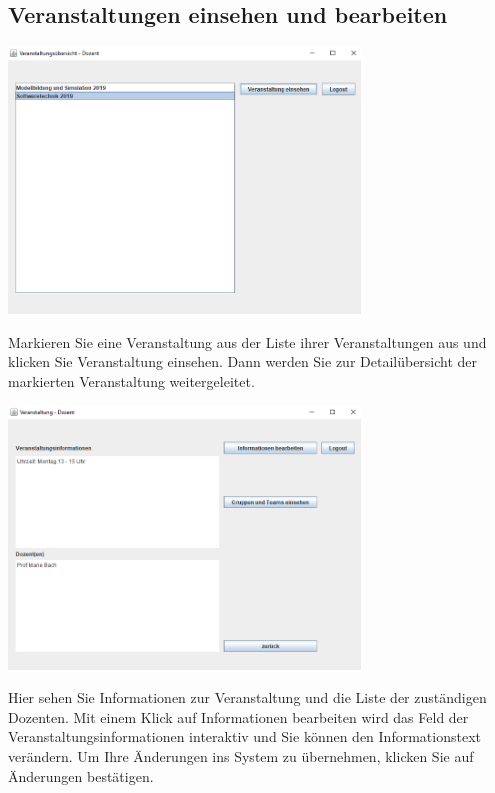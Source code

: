 \documentclass{Handbuch}
\begin{document}
\subsection{Veranstaltungen einsehen und bearbeiten}
\begin{center}
	\includegraphics[width=0.7\textwidth]{img_DozentenGUI_08.png}
\end{center}
Markieren Sie eine Veranstaltung aus der Liste ihrer Veranstaltungen aus und klicken Sie \frqq Veranstaltung einsehen\flqq. Dann werden Sie zur Detailübersicht der markierten Veranstaltung weitergeleitet. 
\begin{center}
	\includegraphics[width=0.7\textwidth]{img_DozentenGUI_09.png}
\end{center}
Hier sehen Sie Informationen zur Veranstaltung und die Liste der zuständigen Dozenten. Mit einem Klick auf \frqq Informationen bearbeiten\flqq{} wird das Feld der Veranstaltungsinformationen interaktiv und Sie können den Informationstext verändern. Um Ihre Änderungen ins System zu übernehmen, klicken Sie auf \frqq Änderungen bestätigen\flqq.
\end{document}
